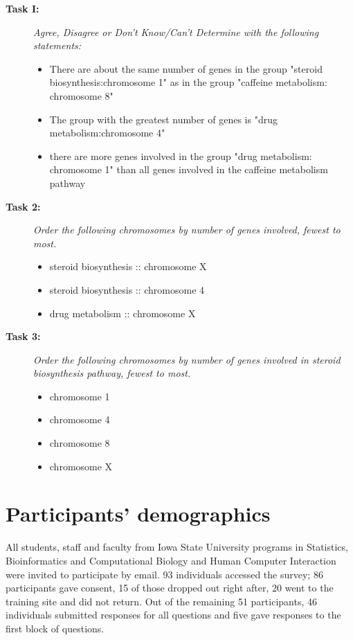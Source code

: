 \documentclass[journal]{vgtc}\usepackage{graphicx, color}
\begin{document}
\begin{appendix}
\begin{description}
\item[\bf Task I:]\emph{ Agree, Disagree or Don't Know/Can't Determine with the following statements:}
\begin{itemize}
\item There are about the same number of genes in the group "steroid biosynthesis:chromosome 1" as in the group "caffeine metabolism: chromosome 8"
\item The group with the greatest number of genes is "drug metabolism:chromosome 4"
\item there are more genes involved in the group "drug metabolism: chromosome 1" than all genes involved in the caffeine metabolism pathway
\end{itemize}

\item[\bf Task 2: \ ]\emph{ Order the following chromosomes by number of genes involved, fewest to most.}
\begin{itemize}
\item steroid biosynthesis :: chromosome X
\item steroid biosynthesis :: chromosome 4
\item drug metabolism :: chromosome X
\end{itemize} 

\item[\bf Task 3: \ ] \emph{ Order the following chromosomes by number of genes involved in steroid biosynthesis pathway, fewest to most.}
\begin{itemize}
\item chromosome 1
\item chromosome 4
\item chromosome 8 
\item chromosome X
\end{itemize}

\end{description} 


%
\section{Participants' demographics}
All students, staff and faculty from Iowa State University programs in Statistics, Bioinformatics and Computational Biology and Human Computer Interaction were invited to participate by email. 93 individuals accessed the survey;
86 participants gave consent, 15  of those dropped out right after, 20 went to the training site and did not return.
Out of the remaining 51 participants, 46  individuals submitted responses for all questions and five gave responses to the first block of questions.


\end{appendix}
\end{document}
